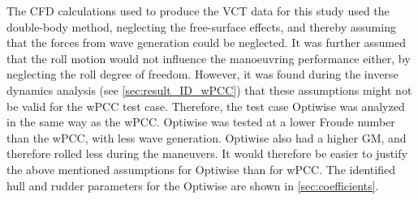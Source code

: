\noindent The CFD calculations used to produce the VCT data for this study used the double-body method, neglecting the free-surface effects, and thereby assuming that the forces from wave generation could be neglected. It was further assumed that the roll motion would not influence the manoeuvring performance either, by neglecting the roll degree of freedom.
However, it was found during the inverse dynamics analysis (see \autoref{sec:result_ID_wPCC}) that these assumptions might not be valid for the wPCC test case. 
Therefore, the test case Optiwise was analyzed in the same way as the wPCC. Optiwise was tested at a lower Froude number than the wPCC, with less wave generation. Optiwise also had a higher GM, and therefore rolled less during the maneuvers. It would therefore be easier to justify the above mentioned assumptions for Optiwise than for wPCC. 
The identified hull and rudder parameters for the Optiwise are shown in \autoref{sec:coefficients}.